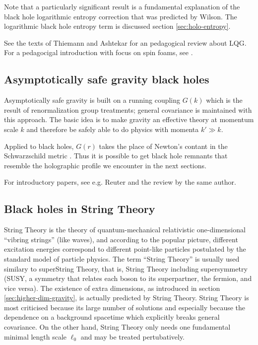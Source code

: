 \documentclass[12pt,a4paper]{report}
\numberwithin{equation}{chapter}
\begin{document}
\begin{appendices}
Note that a particularly significant result is a fundamental explanation of the black hole logarithmic entropy correction that was predicted by Wilson. The logarithmic black hole entropy term is discussed section \ref{sec:holo-entropy}.

See the texts of Thiemann \cite{Thiemann2002, Thiemann2007} and Ashtekar \cite{Ashtekar2004} for an pedagogical review about LQG.  For a pedagocigal introduction with focus on spin foams, see \cite{spin-foam-lrr}.

\subsection{Asymptotically safe gravity black holes}
Asymptotically safe gravity is built on a running coupling $G(k)$ which is the result of renormalization group treatments; general covariance is maintained with this approach. The basic idea is to make gravity an effective theory at momentum scale $k$ and therefore be safely able to do physics with momenta $k' \gg k$.

Applied to black holes, $G(r)$ takes the place of Newton's contant in the Schwarzschild metric \cite{Falls2010}. Thus it is possible to get black hole remnants that resemble the holographic profile we encounter in the next sections.

For introductory papers, see e.g. Reuter \cite{Reuter1996,Reuter2006} and the review \cite{ReuterLRR} by the same author.

\subsection{Black holes in String Theory}

String Theory is the theory of quantum-mechanical relativistic one-dimensional ``vibring strings'' (like waves), and according to the popular picture, different excitation energies correspond to different point-like particles postulated by the standard model of particle physics. The term ``String Theory'' is usually used similary to superString Theory, that is, String Theory including supersymmetry (SUSY, a symmetry that relates each boson to its superpartner, the fermion, and vice versa). The existence of extra dimensions, as introduced in section \ref{sec:higher-dim-gravity}, is actually predicted by String Theory. String Theory is most criticised because its large number of solutions and especially because the dependence on a background spacetime which explicitly breaks general covariance. On the other hand, String Theory only needs one fundamental minimal length scale $\ell_0$ and may be treated pertubatively.


\end{appendices}
\end{document}
